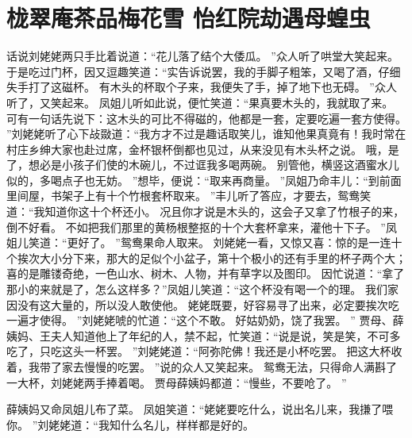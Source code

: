\chapter{栊翠庵茶品梅花雪 \quad 怡红院劫遇母蝗虫}
\par
{}\par
话说刘姥姥两只手比着说道：“花儿落了结个大倭瓜。
”众人听了哄堂大笑起来。
于是吃过门杯，因又逗趣笑道：“实告诉说罢，我的手脚子粗笨，又喝了酒，仔细失手打了这磁杯。
有木头的杯取个子来，我便失了手，掉了地下也无碍。
”众人听了，又笑起来。
凤姐儿听如此说，便忙笑道：“果真要木头的，我就取了来。
可有一句话先说下：这木头的可比不得磁的，他都是一套，定要吃遍一套方使得。
”刘姥姥听了心下敁敠道：“我方才不过是趣话取笑儿，谁知他果真竟有！我时常在村庄乡绅大家也赴过席，金杯银杯倒都也见过，从来没见有木头杯之说。
哦，是了，想必是小孩子们使的木碗儿，不过诓我多喝两碗。
别管他，横竖这酒蜜水儿似的，多喝点子也无妨。
”想毕，便说：“取来再商量。
”凤姐乃命丰儿：“到前面里间屋，书架子上有十个竹根套杯取来。
”丰儿听了答应，才要去，鸳鸯笑道：“我知道你这十个杯还小。
况且你才说是木头的，这会子又拿了竹根子的来，倒不好看。
不如把我们那里的黄杨根整抠的十个大套杯拿来，灌他十下子。
”凤姐儿笑道：“更好了。
”鸳鸯果命人取来。
刘姥姥一看，又惊又喜：惊的是一连十个挨次大小分下来，那大的足似个小盆子，第十个极小的还有手里的杯子两个大；喜的是雕镂奇绝，一色山水、树木、人物，并有草字以及图印。
因忙说道：“拿了那小的来就是了，怎么这样多？”凤姐儿笑道：“这个杯没有喝一个的理。
我们家因没有这大量的，所以没人敢使他。
姥姥既要，好容易寻了出来，必定要挨次吃一遍才使得。
”刘姥姥唬的忙道：“这个不敢。
好姑奶奶，饶了我罢。
”
贾母、薛姨妈、王夫人知道他上了年纪的人，禁不起，忙笑道：“说是说，笑是笑，不可多吃了，只吃这头一杯罢。
”刘姥姥道：“阿弥陀佛！我还是小杯吃罢。
把这大杯收着，我带了家去慢慢的吃罢。
”说的众人又笑起来。
鸳鸯无法，只得命人满斟了一大杯，刘姥姥两手捧着喝。
贾母薛姨妈都道：“慢些，不要呛了。
”\par
薛姨妈又命凤姐儿布了菜。
凤姐笑道：“姥姥要吃什么，说出名儿来，我搛了喂你。
”刘姥姥道：“我知什么名儿，样样都是好的。
